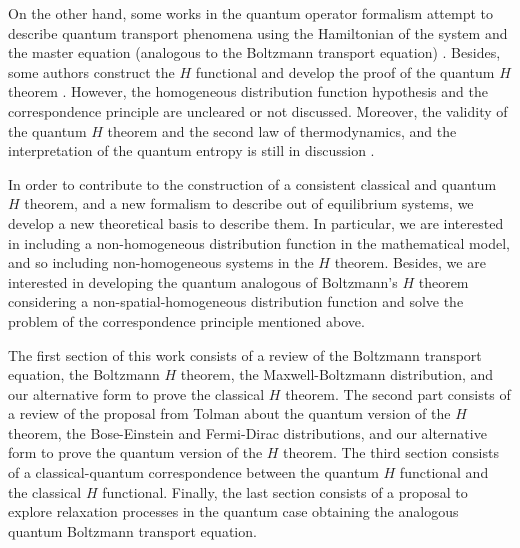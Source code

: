 On the other hand, some works in the quantum operator formalism attempt to
describe quantum transport phenomena using the Hamiltonian of the system and
the master equation (analogous to the Boltzmann transport equation)
\cite{bib:gorban2014,bib:bennaim2017,bib:tolman,bib:li2019}. %
Besides, some authors construct the $H$ functional and develop the proof of the
quantum $H$ theorem \cite{bib:silva2010,bib:deroeck2006,bib:grabert1974}.
However, the homogeneous distribution function hypothesis and the
correspondence principle are uncleared or not discussed. Moreover, the validity
of the quantum $H$ theorem and the second law of thermodynamics, and the
interpretation of the quantum entropy is still in discussion %
\cite{bib:silva2010,bib:deroeck2006,bib:grabert1974,bib:acharya2019,%
bib:kastner2017,bib:gring2012,bib:han2015,bib:das2018}.

In order to contribute to the construction of a consistent classical and
quantum $H$ theorem, and a new formalism to describe out of equilibrium
systems, we develop a new theoretical basis to describe them. In particular, we
are interested in including a non-homogeneous distribution function in the
mathematical model, and so including non-homogeneous systems in the $H$
theorem. Besides, we are interested in developing the quantum analogous of
Boltzmann's $H$ theorem considering a non-spatial-homogeneous distribution
function and solve the problem of the correspondence principle mentioned above.

The first section of this work consists of a review of the
Boltzmann transport equation, the Boltzmann $H$ theorem, the Maxwell-Boltzmann
distribution, and our alternative form to prove the classical $H$ theorem. The
second part consists of a review of the proposal from Tolman about the quantum
version of the $H$ theorem, the Bose-Einstein and Fermi-Dirac distributions,
and our alternative form to prove the quantum version of the $H$ theorem. The
third section consists of a classical-quantum correspondence between the
quantum $H$ functional and the classical $H$ functional. Finally, the last
section consists of a proposal to explore relaxation processes in the quantum
case obtaining the analogous quantum Boltzmann transport equation.

